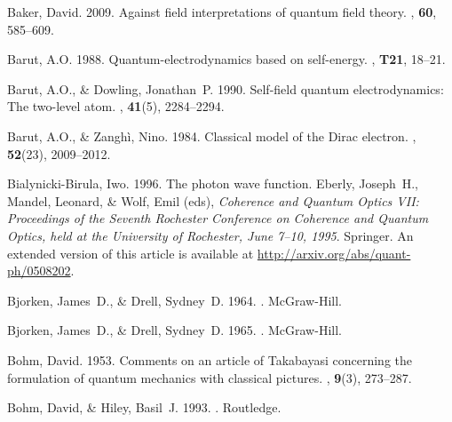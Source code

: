 \documentclass[onecolumn,secnumarabic,amsmath,amssymb,balancelastpage,nofootinbib]{article}
\begin{document}
\begin{thebibliography}{}

Baker, David. 2009.
\newblock Against field interpretations of quantum field theory.
, {\bf 60},
  585--609.

Barut, A.O. 1988.
\newblock Quantum-electrodynamics based on self-energy.
, {\bf T21}, 18--21.

Barut, A.O., \& Dowling, Jonathan~P. 1990.
\newblock Self-field quantum electrodynamics: The two-level atom.
, {\bf 41}(5), 2284--2294.

Barut, A.O., \& Zangh\`{i}, Nino. 1984.
\newblock Classical model of the Dirac electron.
, {\bf 52}(23), 2009--2012.

Bialynicki-Birula, Iwo. 1996.
\newblock The photon wave function.
 Eberly, Joseph~H., Mandel, Leonard, \&
  Wolf, Emil (eds), {\em Coherence and Quantum Optics VII: Proceedings of the
  Seventh Rochester Conference on Coherence and Quantum Optics, held at the
  University of Rochester, June 7--10, 1995}.
\newblock Springer.
\newblock An extended version of this article is available at
  \url{http://arxiv.org/abs/quant-ph/0508202}.

Bjorken, James~D., \& Drell, Sydney~D. 1964.
.
\newblock McGraw-Hill.

Bjorken, James~D., \& Drell, Sydney~D. 1965.
.
\newblock McGraw-Hill.

Bohm, David. 1953.
\newblock Comments on an article of Takabayasi concerning the formulation of
  quantum mechanics with classical pictures.
, {\bf 9}(3), 273--287.

Bohm, David, \& Hiley, Basil~J. 1993.
.
\newblock Routledge.


\end{thebibliography}
\end{document}
